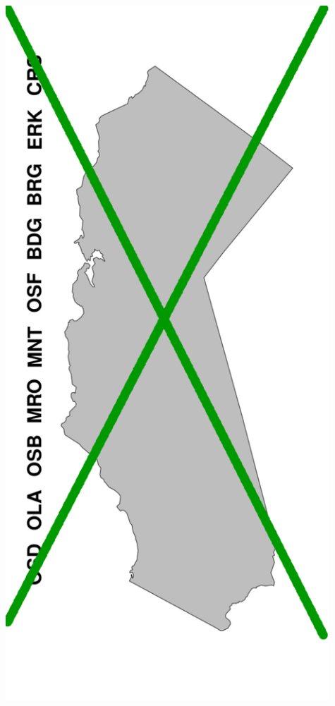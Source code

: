 \documentclass[a0paper,portrait]{baposter}
\begin{document}
\begin{poster}
{\begin{minipage}[h!]{0.19\textwidth}
	        \includegraphics[width=0.91\textwidth]{../pictures/mapFullBlankNotGreen.pdf}
	\end{minipage}
	\begin{minipage}[h!]{0.19\textwidth}

\end{minipage}}
\end{poster}
\end{document}
